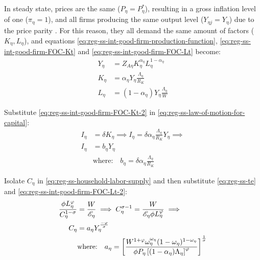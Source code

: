 \documentclass[
thesis.tex
]{subfiles}
\begin{document}
In steady state, prices are the same ($P_{\eta} = P_{\eta}^\ast$), resulting in a gross inflation level of one ($\pi_{\eta} = 1$), and all firms producing the same output level ($Y_{\eta j} = Y_{\eta}$) due to the price parity \cite[Lecture 13, p.12]{solis-garcia_ucb_2022}. For this reason, they all demand the same amount of factors ($K_{\eta}, L_{\eta}$), and equations \ref{eq:reg-ss-int-good-firm-production-function}, \ref{eq:reg-ss-int-good-firm-FOC-Kt} and \ref{eq:reg-ss-int-good-firm-FOC-Lt} become:
\begin{align}
	Y_{\eta} &= Z_{A\eta} K_{\eta}^{\alpha_\eta} L_{\eta}^{1 -{\alpha_\eta}} \label{eq:reg-ss-int-good-firm-production-function-2} \\	
	K_{\eta} &= {\alpha_\eta} Y_{\eta} \frac{\Lambda_{\eta}}{R_K} \label{eq:reg-ss-int-good-firm-FOC-Kt-2} \\
	L_{\eta} &= (1-{\alpha_\eta}) Y_{\eta} \frac{\Lambda_{\eta}}{W} \label{eq:reg-ss-int-good-firm-FOC-Lt-2}
\end{align}
	
	Substitute \ref{eq:reg-ss-int-good-firm-FOC-Kt-2} in \ref{eq:reg-ss-law-of-motion-for-capital}:
	\begin{align}
		I_{\eta} &= \delta K_{\eta} \implies I_{\eta} = \delta {\alpha_\eta} \frac{\Lambda_{\eta}}{R_K} Y_{\eta} \implies \nonumber \\
		I_{\eta} &= b_{\eta} Y_{\eta} \label{eq:reg-ss-investment} \\
		& \text{where:} \quad b_{\eta} = \delta {\alpha_\eta} \frac{\Lambda_{\eta}}{R_K} \label{eq:reg-ss-b-eta}
	\end{align}
	
	Isolate $C_{\eta}$ in \ref{eq:reg-ss-household-labor-supply} and then substitute \ref{eq:reg-ss-te} and \ref{eq:reg-ss-int-good-firm-FOC-Lt-2}:
	\begin{align}
		\frac{\phi L_{\eta}^{\varphi}}{C_{\eta}^{1-\sigma}} &= \frac{W}{\te[]} \implies C_{\eta}^{\sigma -1} = \frac{W}{\te[] \phi L_{\eta}^{\varphi}} \implies \nonumber\\
		C_{\eta} &= a_{\eta} Y_{\eta}^{\frac{-\varphi}{\sigma}} \label{eq:reg-ss-consumption} \\
		& \text{where:} \quad a_{\eta} = \left[ \frac{W^{1 +\varphi} \omega_{\eta}^{\omega_{\eta}} (1 -\omega_{\eta})^{1 -\omega_{\eta}} }{\phi P_{\eta} \left[ (1 -\alpha_{\eta}) \Lambda_{\eta} \right]^{\varphi} } \right]^{\frac{1}{\sigma}} \label{eq:reg-ss-a-eta}
	\end{align}
\end{document}
